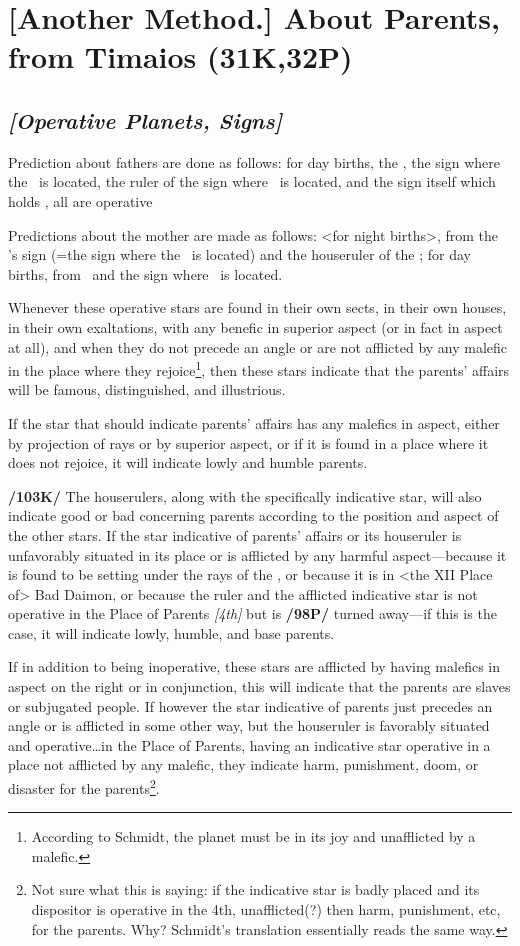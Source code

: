 \section{[Another Method.] About Parents, from Timaios (31K,32P)}
\subsection{\textit{[Operative Planets, Signs]}}
Prediction about fathers are done as follows: for day births, the \Sun, the sign where the \Sun\, is located, the ruler of the sign where \Jupiter\, is located, and the sign itself which holds \Jupiter, all are operative

Predictions about the mother are made as follows: <for night births>, from the \Moon’s sign (=the sign where the \Moon\, is located) and the houseruler of the \Moon; for day births, from \Venus\, and the sign where \Venus\, is located. 

Whenever \mndl these operative stars are found in their own sects, in their own houses, in their own exaltations, with any benefic in superior aspect (or in fact in aspect at all), and when they do not precede an angle or are not afflicted by any malefic in the place where they rejoice\footnote{According to Schmidt, the planet must be in its joy and unafflicted by a malefic.}, then these stars indicate that the parents’ affairs will be famous, distinguished, and illustrious. 

If the star that should indicate parents’ affairs has any malefics in aspect, either by projection of rays or by superior aspect, or if it is found in a place where it does not rejoice, it will indicate lowly and humble parents.

\textbf{/103K/} The houserulers, along with the specifically indicative star, will also indicate good or bad concerning parents according to the position and aspect of the other stars. If the star indicative of parents’ affairs or its houseruler is unfavorably situated \mndl in its place or is afflicted by any harmful aspect—because it is found to be setting under the rays of the \Sun, or because it is in <the XII Place of> Bad Daimon, or because the ruler and the afflicted indicative star is not operative in the Place of Parents \textsl{[4th]} but is \textbf{/98P/} turned away—if this is the case, it will indicate lowly, humble, and base parents. 

If in addition to being inoperative, these stars are afflicted by having malefics in aspect on the right or in conjunction, this will indicate that the parents are slaves or subjugated people. If however the star indicative of parents just precedes an angle or is afflicted in some other way, but the houseruler is favorably situated and operative\ldots in the Place of Parents, having an indicative star operative in a place not afflicted by any malefic, they indicate harm, punishment, doom, or disaster for the parents\footnote{Not sure what this is saying: if the indicative star is badly placed and its dispositor is operative in the 4th, unafflicted(?) then harm, punishment, etc, for the parents. Why? Schmidt's translation essentially reads the same way.}. 

